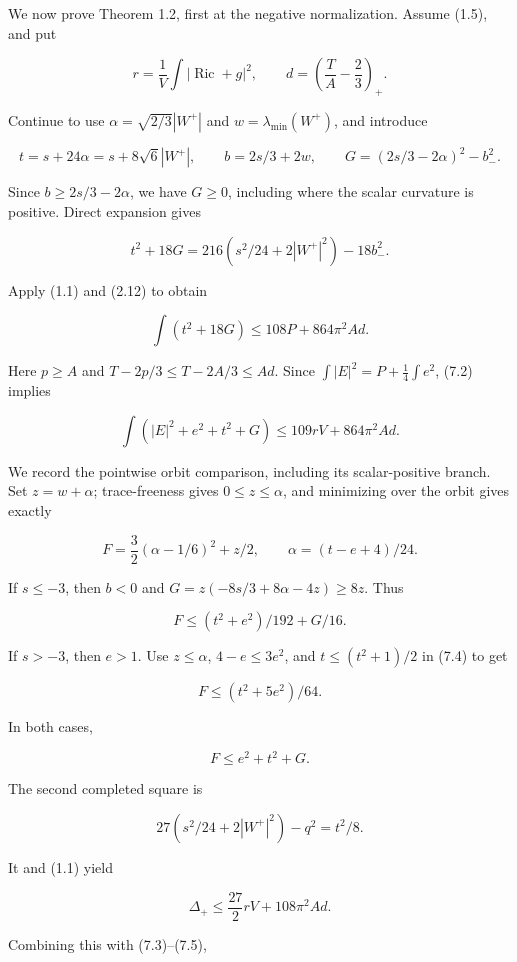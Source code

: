 \documentclass[
  10pt,
]{article}
\begin{document}
We now prove Theorem 1.2, first at the negative normalization. Assume
(1.5), and put

\[
 r=\frac1V\int|\operatorname{Ric}+g|^2,\qquad
 d=\left(\frac TA-\frac23\right)_+.
\]

Continue to use \(\alpha=\sqrt{2/3}|W^+|\) and
\(w=\lambda_{\min}(W^+)\), and introduce

\[
 t=s+24\alpha=s+8\sqrt6|W^+|,\qquad
 b=2s/3+2w,\qquad
 G=(2s/3-2\alpha)^2-b_-^2.                               \tag{7.1}
\]

Since \(b\ge2s/3-2\alpha\), we have \(G\ge0\), including where the
scalar curvature is positive. Direct expansion gives

\[
 t^2+18G=216\left(s^2/24+2|W^+|^2\right)-18b_-^2.
\]

Apply (1.1) and (2.12) to obtain

\[
                    \int(t^2+18G)\le108P+864\pi^2Ad.
 \tag{7.2}
\]

Here \(p\ge A\) and \(T-2p/3\le T-2A/3\le Ad\). Since
\(\int|E|^2=P+\frac14\int e^2\), (7.2) implies

\[
             \int(|E|^2+e^2+t^2+G)\le109rV+864\pi^2Ad.
 \tag{7.3}
\]

We record the pointwise orbit comparison, including its scalar-positive
branch. Set \(z=w+\alpha\); trace-freeness gives \(0\le z\le\alpha\),
and minimizing over the orbit gives exactly

\[
 F=\frac32(\alpha-1/6)^2+z/2,\qquad
                         \alpha=(t-e+4)/24.              \tag{7.4}
\]

If \(s\le-3\), then \(b<0\) and \(G=z(-8s/3+8\alpha-4z)\ge8z\). Thus

\[
                       F\le(t^2+e^2)/192+G/16.
\]

If \(s>-3\), then \(e>1\). Use \(z\le\alpha\), \(4-e\le3e^2\), and
\(t\le(t^2+1)/2\) in (7.4) to get

\[
                       F\le(t^2+5e^2)/64.
\]

In both cases,

\[
                             F\le e^2+t^2+G.             \tag{7.5}
\]

The second completed square is

\[
 27\left(s^2/24+2|W^+|^2\right)-q^2=t^2/8.
\]

It and (1.1) yield

\[
 \Delta_+\le\frac{27}{2}rV+108\pi^2Ad.
\]

Combining this with (7.3)--(7.5),
\end{document}
